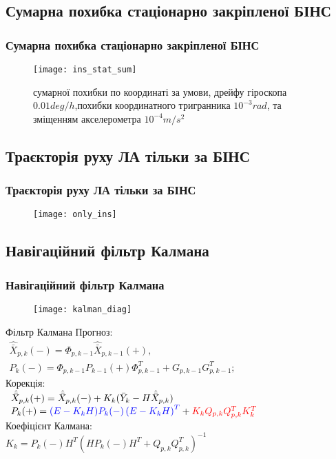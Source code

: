 \documentclass[ucs,compress]{beamer}    %
\begin{document}
\subsection{Сумарна похибка стаціонарно закріпленої БІНС} 
\begin{frame}[plain]
\frametitle{Сумарна похибка стаціонарно закріпленої БІНС}
\begin{figure}[l]
\texttt{[image: ins\_stat\_sum]}
\caption{ сумарної похибки по координаті за умови,
дрейфу гіроскопа   $0.01 deg/h$,похибки координатного тригранника $10^{-3} rad$, та зміщенням акселерометра $10^{-4} m/s^2$}
\label{fig:sdins2}
\end{figure}
\end{frame}
\subsection{Траєкторія руху ЛА тільки за БІНС} 
\begin{frame}%
\frametitle{Траєкторія руху ЛА тільки за БІНС}
\noindent
\begin{figure}[l]
\noindent\texttt{[image: only\_ins]}
\end{figure}

\end{frame}
\subsection{Навігаційний фільтр Калмана} 
\begin{frame}[plain]
\frametitle{Навігаційний фільтр Калмана}
\begin{figure}[l]
\texttt{[image: kalman\_diag]}
\end{figure}
\begin{block}{Фільтр Калмана}
\small
Прогноз: \\
$\begin{array}{l} 
{\hat{\bar{X}}_{p,k}(-) =\Phi_{p,k-1} \hat{\bar{X}}_{p,k-1}(+) ,} \\ 
{P_{k}(-) =\Phi_{p,k-1} P_{k-1}(+) \Phi ^{T}_{p,k-1} +G_{p,k-1} G_{p,k-1}^{T} ;} \end{array} $ \\
Корекція:\\
$\begin{array}{l} 
{\hat{\bar{X}}_{p,k}(+)=\hat{\bar{X}}_{p,k}(-) + K_{k} (\bar{Y}_{k} -H\hat{\bar{X}}_{p,k} )} \\ 
{P_{k}(+)={\color{blue}(E-K_{k} H)P_{k}(-) \left(E-K_{k} H\right)^{T}} +{\color{red} K_{k} Q_{p,k} Q_{p,k} ^{T} K_{k}^{T}} } 
\end{array} $ \\
Коефіцієнт Калмана:\\
$K_{k} =P_{k}(-) H^{T} (HP_{k}(-) H^{T} +Q_{p,k} Q_{p,k} ^{T} )^{-1} $
\end{block}
\end{frame}
\end{document}
